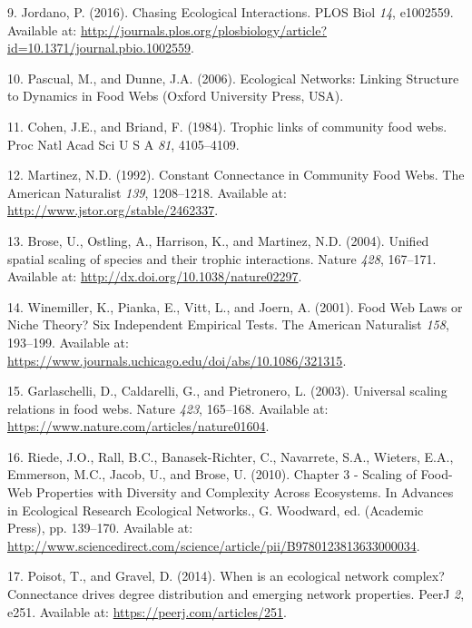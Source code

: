\documentclass[12pt]{article}
\begin{document}
\begin{cslreferences}
\leavevmode\hypertarget{ref-Jord16}{}%
9. Jordano, P. (2016). Chasing Ecological Interactions. PLOS Biol
\emph{14}, e1002559. Available at:
\url{http://journals.plos.org/plosbiology/article?id=10.1371/journal.pbio.1002559}.

\leavevmode\hypertarget{ref-PascDunn06}{}%
10. Pascual, M., and Dunne, J.A. (2006). Ecological Networks: Linking
Structure to Dynamics in Food Webs (Oxford University Press, USA).

\leavevmode\hypertarget{ref-CoheBria84}{}%
11. Cohen, J.E., and Briand, F. (1984). Trophic links of community food
webs. Proc Natl Acad Sci U S A \emph{81}, 4105--4109.

\leavevmode\hypertarget{ref-mart92ccc}{}%
12. Martinez, N.D. (1992). Constant Connectance in Community Food Webs.
The American Naturalist \emph{139}, 1208--1218. Available at:
\url{http://www.jstor.org/stable/2462337}.

\leavevmode\hypertarget{ref-BrosOstl04}{}%
13. Brose, U., Ostling, A., Harrison, K., and Martinez, N.D. (2004).
Unified spatial scaling of species and their trophic interactions.
Nature \emph{428}, 167--171. Available at:
\url{http://dx.doi.org/10.1038/nature02297}.

\leavevmode\hypertarget{ref-WinePian01}{}%
14. Winemiller, K., Pianka, E., Vitt, L., and Joern, A. (2001). Food Web
Laws or Niche Theory? Six Independent Empirical Tests. The American
Naturalist \emph{158}, 193--199. Available at:
\url{https://www.journals.uchicago.edu/doi/abs/10.1086/321315}.

\leavevmode\hypertarget{ref-GarlCald03}{}%
15. Garlaschelli, D., Caldarelli, G., and Pietronero, L. (2003).
Universal scaling relations in food webs. Nature \emph{423}, 165--168.
Available at: \url{https://www.nature.com/articles/nature01604}.

\leavevmode\hypertarget{ref-RiedRall10}{}%
16. Riede, J.O., Rall, B.C., Banasek-Richter, C., Navarrete, S.A.,
Wieters, E.A., Emmerson, M.C., Jacob, U., and Brose, U. (2010). Chapter
3 - Scaling of Food-Web Properties with Diversity and Complexity Across
Ecosystems. In Advances in Ecological Research Ecological Networks., G.
Woodward, ed. (Academic Press), pp. 139--170. Available at:
\url{http://www.sciencedirect.com/science/article/pii/B9780123813633000034}.

\leavevmode\hypertarget{ref-PoisGrav14}{}%
17. Poisot, T., and Gravel, D. (2014). When is an ecological network
complex? Connectance drives degree distribution and emerging network
properties. PeerJ \emph{2}, e251. Available at:
\url{https://peerj.com/articles/251}.


\end{cslreferences}
\end{document}
